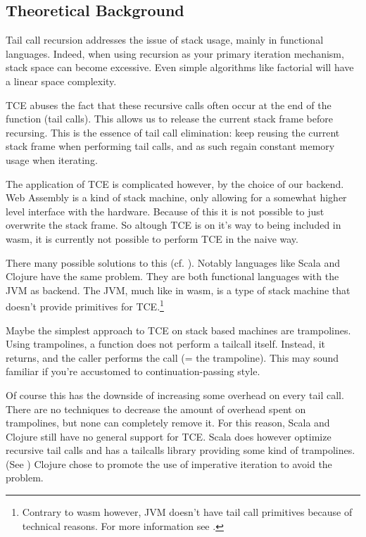 
\subsection{Theoretical Background}
Tail call recursion addresses the issue of stack usage, mainly in functional languages. Indeed, when using recursion as your primary iteration mechanism, stack space can become excessive. Even simple algorithms like factorial will have a linear space complexity. 

TCE abuses the fact that these recursive calls often occur at the end of the function (tail calls). This allows us to release the current stack frame before recursing. This is the essence of tail call elimination: keep reusing the current stack frame when performing tail calls, and as such regain constant memory usage when iterating.

The application of TCE is complicated however, by the choice of our backend. Web Assembly is a kind of stack machine, only allowing for a somewhat higher level interface with the hardware. Because of this it is not possible to just overwrite the stack frame. So altough TCE is on it's way to being included in wasm, it is currently not possible to perform TCE in the naive way.

There many possible solutions to this (cf. \cite{Slides}). Notably languages like Scala and Clojure have the same problem. They are both functional languages with the JVM as backend. The JVM, much like in wasm, is a type of stack machine that doesn't provide primitives for TCE.\footnote{Contrary to wasm however, JVM doesn't have tail call primitives because of technical reasons. For more information see \cite{clements2004tail}.}

Maybe the simplest approach to TCE on stack based machines are trampolines. Using trampolines, a function does not perform a tailcall itself. Instead, it returns, and the caller performs the call (= the trampoline). This may sound familiar if you're accustomed to continuation-passing style.

Of course this has the downside of increasing some overhead on every tail call. There are no techniques to decrease the amount of overhead spent on trampolines, but none can completely remove it. For this reason, Scala and Clojure still have no general support for TCE. Scala does however optimize recursive tail calls and has a tailcalls library providing some kind of trampolines. (See \cite{bjarnarson2012stackless}) Clojure chose to promote the use of imperative iteration to avoid the problem.

